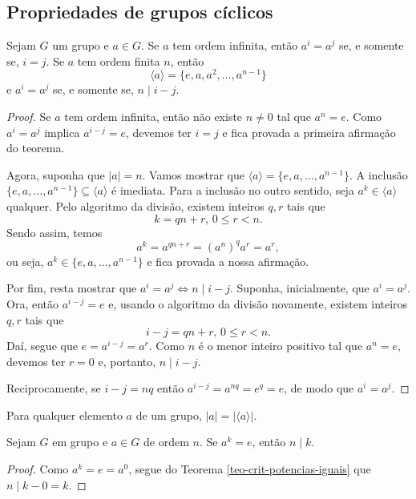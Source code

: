 \subsection*{Propriedades de grupos cíclicos}
%
\begin{theorem}
\label{teo-crit-potencias-iguais}
    Sejam $G$ um grupo e $a\in G$. Se $a$ tem ordem infinita, então $a^i = a^j$ se, e somente se, $i=j$.
    Se $a$ tem ordem finita $n$, então 
    \[
    \langle a \rangle = \{e, a, a^2, \dots, a^{n-1}\}
    \]
    e $a^i = a^j$ se, e somente se, $n\mid i-j$.
\end{theorem}
%
\begin{proof}
    Se $a$ tem ordem infinita, então não existe $n\neq 0$ tal que $a^n = e$. Como $a^i = a^j$ implica
    $a^{i-j} = e$, devemos ter $i=j$ e fica provada a primeira afirmação do teorema.
    
    Agora, suponha que $|a| = n$. Vamos mostrar que $\langle a \rangle = \{e, a, \dots, a^{n-1}\}$.
    A inclusão $\{e, a, \dots, a^{n-1}\} \subseteq \langle a \rangle$ é imediata. Para a inclusão
    no outro sentido, seja $a^k \in \langle a \rangle$ qualquer. Pelo algoritmo da divisão, existem
    inteiros $q, r$ tais que
    \[
    k = qn + r, \, 0\leq r < n.
    \]
    Sendo assim, temos
    \[
    a^k = a^{qn + r} = (a^n)^qa^r = a^r,
    \]
    ou seja, $a^k \in\{e, a, \dots, a^{n-1}\}$ e fica provada a nossa afirmação.
    
    Por fim, resta mostrar que $a^i = a^j \iff n\mid i-j$. Suponha, inicialmente, que $a^i = a^j$.
    Ora, então $a^{i-j} = e$ e, usando o algoritmo da divisão novamente, existem inteiros $q,r$ tais
    que
    \[
    i-j = qn + r, \, 0\leq r < n.
    \]
    Daí, segue que $e = a^{i-j} = a^r$. Como $n$ é o menor inteiro positivo tal que $a^n = e$, devemos
    ter $r=0$ e, portanto, $n\mid i-j$.
    
    Reciprocamente, se $i-j = nq$ então $a^{i-j} = a^{nq} = e^q = e$, de modo que $a^i = a^j$.
\end{proof}
%
\begin{corollary}
\label{cor-ordem-elemento-ordem-subgrupo}
    Para qualquer elemento $a$ de um grupo, $|a| = |\langle a \rangle|$.
\end{corollary}
%
\begin{corollary}
\label{cor-num-divide-ordem}
    Sejam $G$ em grupo e $a\in G$ de ordem $n$. Se $a^k = e$, então $n\mid k$.
\end{corollary}
%
\begin{proof}
    Como $a^k = e = a^0$, segue do Teorema \ref{teo-crit-potencias-iguais} que $n\mid k-0 = k$.
\end{proof}

